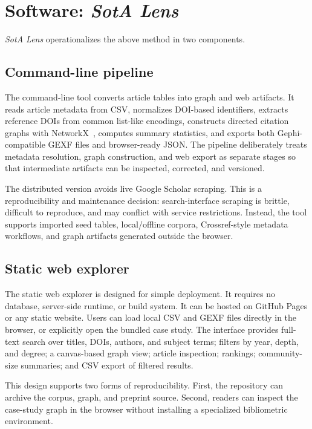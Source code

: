 \documentclass[11pt,a4paper]{article}
\newcommand{\tool}{\emph{SotA Lens}}
\begin{document}
\section{Software: \tool}

\tool{} operationalizes the above method in two components.

\subsection{Command-line pipeline}

The command-line tool converts article tables into graph and web artifacts. It reads article metadata from CSV, normalizes DOI-based identifiers, extracts reference DOIs from common list-like encodings, constructs directed citation graphs with NetworkX~\citep{hagberg2008networkx}, computes summary statistics, and exports both Gephi-compatible GEXF files and browser-ready JSON. The pipeline deliberately treats metadata resolution, graph construction, and web export as separate stages so that intermediate artifacts can be inspected, corrected, and versioned.

The distributed version avoids live Google Scholar scraping. This is a reproducibility and maintenance decision: search-interface scraping is brittle, difficult to reproduce, and may conflict with service restrictions. Instead, the tool supports imported seed tables, local/offline corpora, Crossref-style metadata workflows, and graph artifacts generated outside the browser.

\subsection{Static web explorer}

The static web explorer is designed for simple deployment. It requires no database, server-side runtime, or build system. It can be hosted on GitHub Pages or any static website. Users can load local CSV and GEXF files directly in the browser, or explicitly open the bundled case study. The interface provides full-text search over titles, DOIs, authors, and subject terms; filters by year, depth, and degree; a canvas-based graph view; article inspection; rankings; community-size summaries; and CSV export of filtered results.

This design supports two forms of reproducibility. First, the repository can archive the corpus, graph, and preprint source. Second, readers can inspect the case-study graph in the browser without installing a specialized bibliometric environment.
\end{document}

